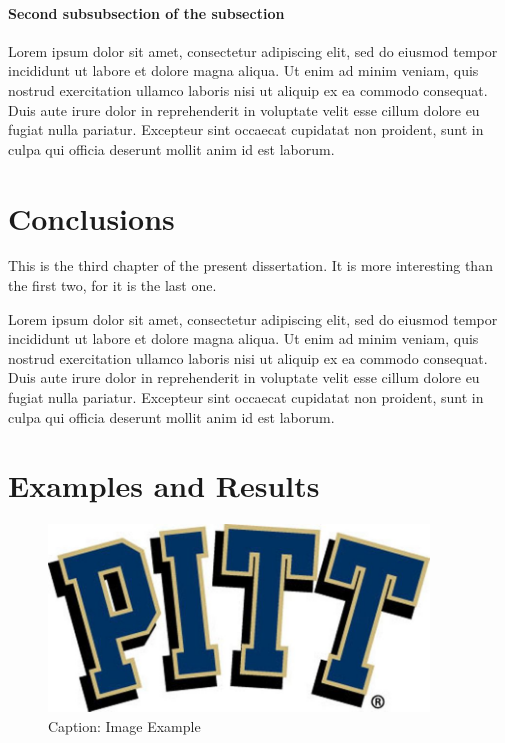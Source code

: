 \documentclass[hidelinks,pdftex,phd]{pittetd}
\begin{document}
\subsubsection{Second subsubsection of the subsection}
Lorem ipsum dolor sit amet, consectetur adipiscing elit, sed do eiusmod tempor incididunt ut labore et dolore magna aliqua.\cite{DUMMY:3} Ut enim ad minim veniam, quis nostrud exercitation ullamco laboris nisi ut aliquip ex ea commodo consequat. Duis aute irure dolor in reprehenderit in voluptate velit esse cillum dolore eu fugiat nulla pariatur.\cite{DUMMY:4} Excepteur sint occaecat cupidatat non proident, sunt in culpa qui officia deserunt mollit anim id est laborum.\cite{DUMMY:5}


\chapter{Conclusions}
This is the third chapter of the present dissertation.\cite{DUMMY:6} It is more interesting than the first two, for it is the last one.\cite{DUMMY:7}

Lorem ipsum dolor sit amet, consectetur adipiscing elit, sed do eiusmod tempor incididunt ut labore et dolore magna aliqua.\cite{DUMMY:8} Ut enim ad minim veniam, quis nostrud exercitation ullamco laboris nisi ut aliquip ex ea commodo consequat.\cite{DUMMY:9} Duis aute irure dolor in reprehenderit in voluptate velit esse cillum dolore eu fugiat nulla pariatur.\cite{DUMMY:10} Excepteur sint occaecat cupidatat non proident, sunt in culpa qui officia deserunt mollit anim id est laborum.



\appendix     
\chapter{Examples and Results}
\begin{figure}[t]
    \centering
    \includegraphics[width=0.9\textwidth]{Images/Picture-Example.jpg}
    \caption{Caption: Image Example}
    
    \label{Reference: Picture Example}
\end{figure}
\end{document}
